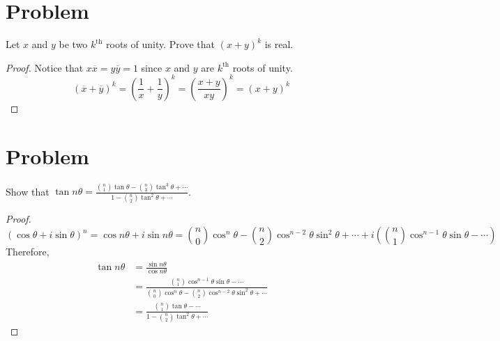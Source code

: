 \documentclass{article}
\begin{document}
\section*{Problem}
Let $x$ and $y$ be two $k^\text{th}$ roots of unity. Prove that $(x + y)^k$ is real.
\begin{proof}
Notice that $x\overline{x} = y\overline{y} = 1$ since $x$ and $y$ are $k^\text{th}$ roots of unity.
$$
(\overline{x} + \overline{y})^k = \left( \frac{1}{x} + \frac{1}{y} \right)^k = \left( \frac{x + y}{xy}\right)^k = (x + y)^k
$$
\end{proof}

\section*{Problem}
Show that $\tan n\theta = \frac{\binom{n}{1} \tan \theta - \binom{n}{3} \tan^3 \theta + \cdots}{1 - \binom{n}{2} \tan^2 \theta + \cdots}$.
\begin{proof}
\[
(\cos\theta + i \sin\theta)^n = \cos n\theta + i\sin n\theta = \binom{n}{0} \cos^n\theta - \binom{n}{2} \cos^{n - 2}\theta \sin^2\theta + \cdots + i\left( \binom{n}{1}\cos^{n - 1}\theta \sin\theta - \cdots \right)
\]
Therefore,
\begin{align*}
    \tan n\theta
    &= \frac{\sin n\theta}{\cos n\theta} \\
    &= \frac{\binom{n}{1}\cos^{n - 1}\theta \sin\theta - \cdots}{\binom{n}{0} \cos^n\theta - \binom{n}{2} \cos^{n - 2}\theta \sin^2\theta + \cdots} \\
    &= \frac{\binom{n}{1} \tan \theta - \cdots}{1 - \binom{n}{2} \tan^2 \theta + \cdots}
\end{align*}
\end{proof}
\end{document}
